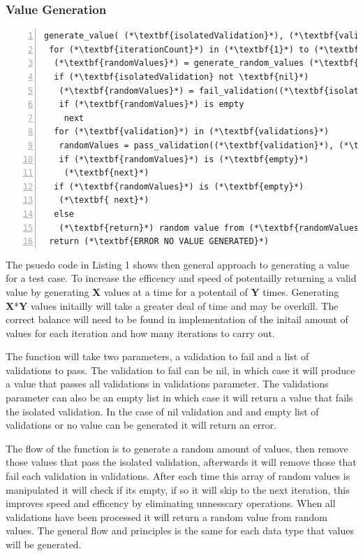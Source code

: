 \documentclass[a4paper,12pt]{article}
\begin{document}
\subsubsection{Value Generation}
\begin{lstlisting}[frame=single,numbers=left,caption= {Pseudo code for value generation} label={psuedo:value}]
generate_value( (*\textbf{isolatedValidation}*), (*\textbf{validations}*))
 for (*\textbf{iterationCount}*) in (*\textbf{1}*) to (*\textbf{X}*)
  (*\textbf{randomValues}*) = generate_random_values (*\textbf{Y}*)
  if (*\textbf{isolatedValidation} not \textbf{nil}*)
   (*\textbf{randomValues}*) = fail_validation((*\textbf{isolatedValidation}*), (*\textbf{randomValues}*))
   if (*\textbf{randomValues}*) is empty
    next
  for (*\textbf{validation}*) in (*\textbf{validations}*)
   randomValues = pass_validation((*\textbf{validation}*), (*\textbf{randomValues}*))
   if (*\textbf{randomValues}*) is (*\textbf{empty}*)
    (*\textbf{next}*)
  if (*\textbf{randomValues}*) is (*\textbf{empty}*)
   (*\textbf{ next}*)
  else
   (*\textbf{return}*) random value from (*\textbf{randomValues}*)
 return (*\textbf{ERROR NO VALUE GENERATED}*)
\end{lstlisting}

\par The psuedo code in Listing 1 shows then general approach to generating a value for a test case. To increase the efficency and speed of potentailly returning a valid value by generating \textbf{X} values at a time for a potentail of \textbf{Y} times. Generating \textbf{X}*\textbf{Y} values initailly will take a greater deal of time and may be overkill. The correct balance will need to be found in implementation of the initail amount of values for each iteration and how many iterations to carry out.
\par The function will take two parameters, a validation to fail and a list of validations to pass. The validation to fail can be nil, in which case it will produce a value that passes all validations in validations parameter. The validations parameter can also be an empty list in which case it will return a value that fails the isolated validation. In the case of nil validation and and empty list of validations or no value can be generated it will return an error.
\par The flow of the function is to generate a random amount of values, then remove those values that pass the isolated validation, afterwards it will remove those that fail each validation in validations. After each time this array of random values is manipulated it will check if its empty, if so it will skip to the next iteration, this improves speed and efficency by eliminating unnesscary operations. When all validations have been processed it will return a random value from random values. The general flow and principles is the same for each data type that values will be generated.
\end{document}
